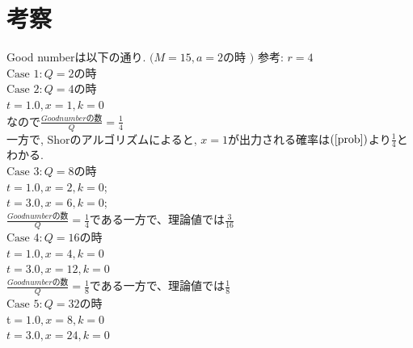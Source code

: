 \documentclass{jsarticle}
\theoremstyle{definition}
\begin{document}
\section{考察}
Good numberは以下の通り. $(M=15, a=2$の時 $)$ 参考: $r=4$\\
$\text{Case } 1: Q=2$の時\\
$\text{Case } 2:  Q=4$の時\\
$t=1.0, x=1, k=0 $\\
なので$ \frac{Good numberの数}{Q}=\frac{1}{4}$\\
一方で, Shorのアルゴリズムによると, $x=1$が出力される確率は$(\ref{prob})$より$\frac{1}{4}$とわかる.\\
$\text{Case } 3:  Q=8$の時 \\
$t=1.0, x=2, k=0$;\\
$t=3.0, x=6, k=0$;\\
$ \frac{Good numberの数}{Q}=\frac{1}{4}$である一方で、理論値では$\frac{3}{16}$ \\
$\text{Case } 4:  Q=16$の時 \\
$t=1.0, x=4, k=0$\\
$t=3.0, x=12, k=0$\\
$ \frac{Good numberの数}{Q}=\frac{1}{8}$である一方で、理論値では$\frac{1}{8}$ \\
$\text{Case } 5:  Q=32$の時 \\
t$=1.0, x=8, k=0$\\
$t=3.0, x=24, k=0$
\end{document}
